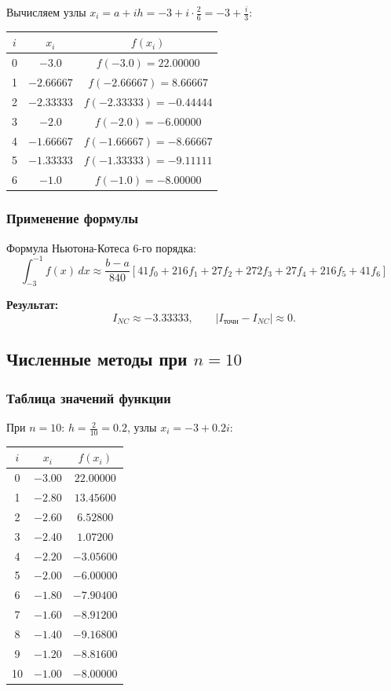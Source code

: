\documentclass[a4paper,12pt]{article}
\begin{document}
Вычисляем узлы $x_i = a + ih = -3 + i \cdot \frac{2}{6} = -3 + \frac{i}{3}$:

\begin{center}
\begin{tabular}{|c|c|c|}
\hline
$i$ & $x_i$ & $f(x_i)$ \\
\hline
0 & $-3.0$ & $f(-3.0) = 22.00000$ \\
1 & $-2.66667$ & $f(-2.66667) = 8.66667$ \\
2 & $-2.33333$ & $f(-2.33333) = -0.44444$ \\
3 & $-2.0$ & $f(-2.0) = -6.00000$ \\
4 & $-1.66667$ & $f(-1.66667) = -8.66667$ \\
5 & $-1.33333$ & $f(-1.33333) = -9.11111$ \\
6 & $-1.0$ & $f(-1.0) = -8.00000$ \\
\hline
\end{tabular}
\end{center}

\subsubsection*{Применение формулы}

Формула Ньютона-Котеса 6-го порядка:
\[
\int_{-3}^{-1} f(x)\,dx \approx \frac{b-a}{840}[41f_0 + 216f_1 + 27f_2 + 272f_3 + 27f_4 + 216f_5 + 41f_6]
\]

\textbf{Результат:}
\[
I_{NC} \approx -3.33333, \qquad |I_{\text{точн}}-I_{NC}|\approx0.
\]

\newpage

\subsection{Численные методы при $n = 10$}

\subsubsection*{Таблица значений функции}

При $n = 10$: $h = \frac{2}{10} = 0.2$, узлы $x_i = -3 + 0.2i$:

\begin{center}
\begin{tabular}{|c|c|c|}
\hline
$i$ & $x_i$ & $f(x_i)$ \\
\hline
0 & $-3.00$ & $22.00000$ \\
1 & $-2.80$ & $13.45600$ \\
2 & $-2.60$ & $6.52800$ \\
3 & $-2.40$ & $1.07200$ \\
4 & $-2.20$ & $-3.05600$ \\
5 & $-2.00$ & $-6.00000$ \\
6 & $-1.80$ & $-7.90400$ \\
7 & $-1.60$ & $-8.91200$ \\
8 & $-1.40$ & $-9.16800$ \\
9 & $-1.20$ & $-8.81600$ \\
10 & $-1.00$ & $-8.00000$ \\
\hline
\end{tabular}
\end{center}
\end{document}
